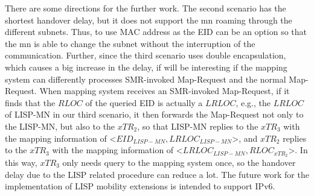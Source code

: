 There are some directions for the further work. The second scenario has the shortest handover delay, but it does not support the \acrshort{mn} roaming through the different subnets. Thus, to use MAC address as the EID can be an option so that the \acrshort{mn} is able to change the subnet without the interruption of the communication. Further, since the third scenario uses double encapsulation, which causes a big increase in the delay, if will be interesting if the mapping system can differently processes SMR-invoked Map-Request and the normal Map-Request. When mapping system receives an SMR-invoked Map-Request, if it finds that the $RLOC$ of the queried EID is actually a $LRLOC$, e.g., the $LRLOC$ of LISP-MN in our third scenario, it then forwards the Map-Request not only to the LISP-MN, but also to the $xTR_2$, so that LISP-MN replies to the $xTR_3$ with the mapping information of <$EID_{LISP-MN}, LRLOC_{LISP-MN}$>, and $xTR_2$ replies to the $xTR_3$ with the mapping information of <$LRLOC_{LISP-MN}, RLOC_{xTR_2}$>. In this way, $xTR_3$ only needs query to the mapping system once, so the handover delay due to the LISP related procedure can reduce a lot. The future work for the implementation of LISP mobility extensions is intended to support IPv6. %